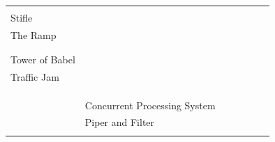\documentclass[espaco=umemeio,chapter=TITLE,twoside,openright]{abnt}
\begin{document}
\begin{table}[!h]
\begin{tabular}{|l|l|l|llll}
\begin{minipage}{0.4\textwidth}
  \end{minipage}
&  &  &  &  \\ \cline{1-1} \cline{3-3}
Stifle                                  &                              & \cite{Wert2014}                                                                                                &  &  &  &  \\ \cline{1-1} \cline{3-3}
The Ramp                                &                              & \begin{minipage}{0.4\textwidth}\cite{Trubiani2011} \\ \cite{Vetoio2011} \\ \cite{Smith2003}   \end{minipage}                                                        &  &  &  &  \\ \cline{1-1} \cline{3-3}
Tower of Babel                          &                              & \begin{minipage}{0.4\textwidth}\cite{Trubiani2011} \cite{Vetoio2011}   \end{minipage}                                                                        &  &  &  &  \\ \cline{1-1} \cline{3-3}
Traffic Jam                             & \multirow{-10}{*}{}          & \begin{minipage}{0.4\textwidth}\cite{Vetoio2011} \\ \cite{Smith2003} \\ \cite{Smith2002} \end{minipage}                                                            &  &  &  &  \\ \cline{1-3}
                                        &                              &\begin{minipage}{0.4\textwidth} \cite{Cortellessa2007} \cite{Trubiani2011} \cite{Smith2003} \end{minipage}                                                     &  &  &  &  \\ \cline{2-3}
                                        & Concurrent Processing System & \begin{minipage}{0.4\textwidth} \cite{Vetoio2011} \cite{Smith2003} \end{minipage}                                                                             &  &  &  &  \\ \cline{2-3}
                                        & Piper and Filter             & \begin{minipage}{0.4\textwidth} \cite{Vetoio2011} \\ \cite{Smith2003}  \end{minipage}                                                                            &  &  &  &  \\ \cline{2-3}

\end{tabular}
\end{table}
\end{document}
